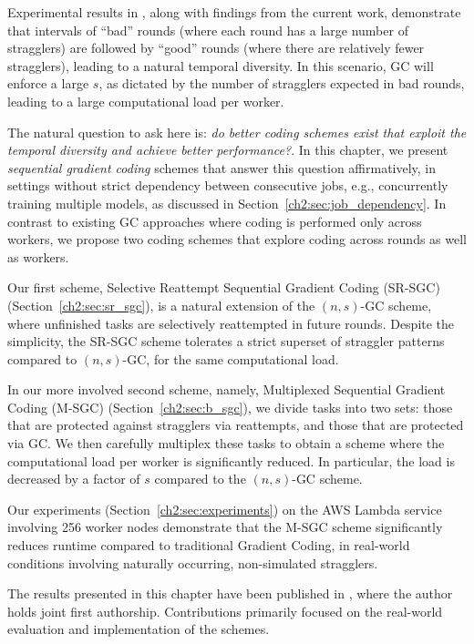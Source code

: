 Experimental results in \cite{timelycodedcomputing}, along with findings from the current work, demonstrate that intervals of “bad” rounds (where each round has a large number of stragglers) are followed by  “good” rounds (where there are relatively fewer stragglers), leading to a natural temporal diversity. In this scenario, GC will enforce a large $s$, as dictated by the number of stragglers expected in bad rounds, leading to a large computational load per worker. 

The natural question to ask here is: \textit{do better coding schemes exist that exploit the temporal diversity and achieve better performance?}. In this chapter, we present \textit{sequential gradient coding} schemes that answer this question affirmatively, in settings without strict dependency between consecutive jobs, e.g., concurrently training multiple models, as discussed in Section~\ref{ch2:sec:job_dependency}. In contrast to existing GC approaches where coding is performed only across workers, we propose two coding schemes that explore coding across rounds as well as workers.

Our first scheme, Selective Reattempt Sequential Gradient Coding (SR-SGC) (Section~\ref{ch2:sec:sr_sgc}), is a natural extension of the $(n,s)$-GC scheme, where unfinished tasks are selectively reattempted in future rounds. Despite the simplicity, the SR-SGC scheme tolerates a strict superset of straggler patterns compared to $(n,s)$-GC, for the same computational load.

In our more involved second scheme, namely, Multiplexed Sequential Gradient Coding (M-SGC) (Section~\ref{ch2:sec:b_sgc}), we divide tasks into two sets: those that are protected against stragglers via reattempts, and those that are protected via GC. We then carefully multiplex these tasks to obtain a scheme where the computational load per worker is significantly reduced. In particular, the load is decreased by a factor of $s$ compared to the $(n,s)$-GC scheme. 

Our experiments (Section~\ref{ch2:sec:experiments}) on the AWS Lambda service involving 256 worker nodes demonstrate that the M-SGC scheme significantly reduces runtime compared to traditional Gradient Coding, in real-world conditions involving naturally occurring, non-simulated stragglers. 

The results presented in this chapter have been published in \cite{krishnan2023sequential}, where the author holds joint first authorship. Contributions primarily focused on the real-world evaluation and implementation of the schemes.


